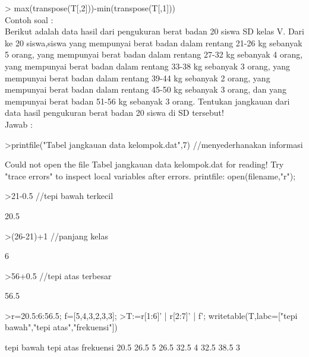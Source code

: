 \documentclass[a4paper,10pt]{article}
\begin{document}
\begin{eulernotebook}
\begin{eulercomment}
\begin{eulercomment}
\begin{eulercomment}
\begin{eulercomment}
\begin{eulercomment}
\begin{eulercomment}
\begin{eulercomment}
\begin{eulercomment}
\begin{eulercomment}
\begin{eulercomment}
\begin{eulercomment}
\begin{eulercomment}
\begin{eulercomment}
\begin{eulercomment}
\begin{eulercomment}
\textgreater{} max(transpose(T[,2]))-min(transpose(T[,1]))\\
Contoh soal :\\
Berikut adalah data hasil dari pengukuran berat badan 20 siswa SD
kelas V. Dari ke 20 siswa,siswa yang mempunyai berat badan dalam
rentang 21-26 kg sebanyak 5 orang, yang mempunyai berat badan dalam
rentang 27-32 kg sebanyak 4 orang, yang mempunyai berat badan dalam
rentang 33-38 kg sebanyak 3 orang, yang mempunyai berat badan dalam
rentang 39-44 kg sebanyak 2 orang, yang mempunyai berat badan dalam
rentang 45-50 kg sebanyak 3 orang, dan yang mempunyai berat badan
51-56 kg sebanyak 3 orang. Tentukan jangkauan dari\\
data hasil pengukuran berat badan 20 siswa di SD tersebut!\\
Jawab :
\end{eulercomment}
\begin{eulerprompt}
>printfile("Tabel jangkauan data kelompok.dat",7) //menyederhanakan informasi
\end{eulerprompt}
\begin{euleroutput}
  Could not open the file
  Tabel jangkauan data kelompok.dat
  for reading!
  Try "trace errors" to inspect local variables after errors.
  printfile:
      open(filename,"r");
\end{euleroutput}
\begin{eulerprompt}
>21-0.5 //tepi bawah terkecil
\end{eulerprompt}
\begin{euleroutput}
  20.5
\end{euleroutput}
\begin{eulerprompt}
>(26-21)+1 //panjang kelas
\end{eulerprompt}
\begin{euleroutput}
  6
\end{euleroutput}
\begin{eulerprompt}
>56+0.5 //tepi atas terbesar
\end{eulerprompt}
\begin{euleroutput}
  56.5
\end{euleroutput}
\begin{eulerprompt}
>r=20.5:6:56.5; f=[5,4,3,2,3,3];
>T:=r[1:6]' | r[2:7]' | f'; writetable(T,labc=["tepi bawah","tepi atas","frekuensi"])
\end{eulerprompt}
\begin{euleroutput}
   tepi bawah tepi atas frekuensi
         20.5      26.5         5
         26.5      32.5         4
         32.5      38.5         3

\end{euleroutput}
\end{eulercomment}
\end{eulercomment}
\end{eulercomment}
\end{eulercomment}
\end{eulercomment}
\end{eulercomment}
\end{eulercomment}
\end{eulercomment}
\end{eulercomment}
\end{eulercomment}
\end{eulercomment}
\end{eulercomment}
\end{eulercomment}
\end{eulercomment}
\end{eulernotebook}
\end{document}
